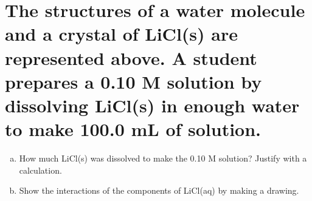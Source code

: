 \documentclass[11pt]{article}
\begin{document}
\section{The structures of a water molecule and a crystal of LiCl(s) are represented above. A student prepares a 0.10 M solution by dissolving LiCl(s) in enough water to make 100.0 mL of solution.}
\label{sec:orgd473b08}
\begin{enumerate}[(a)]
\item How much LiCl(s) was dissolved to make the 0.10 M solution? Justify with a
calculation.
\item Show the interactions of the components of LiCl(aq) by making a drawing.
\end{enumerate}
\end{document}
